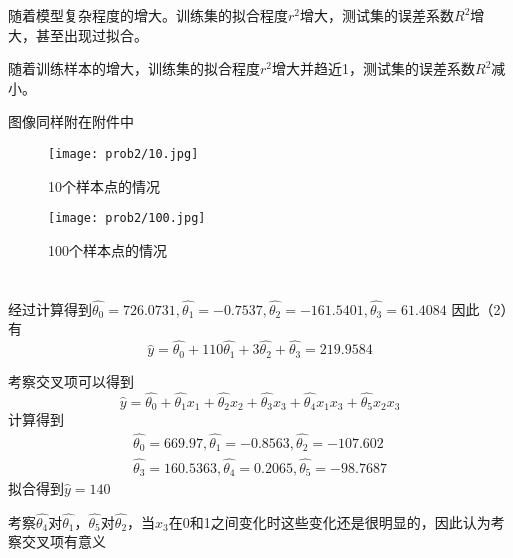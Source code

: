 \documentclass[UTF8,a4paper]{ctexart}
\begin{document}
随着模型复杂程度的增大。训练集的拟合程度$r^2$增大，测试集的误差系数$R^2$增大，甚至出现过拟合。

随着训练样本的增大，训练集的拟合程度$r^2$增大并趋近1，测试集的误差系数$R^2$减小。

图像同样附在附件中
\begin{figure}
\centering
\texttt{[image: prob2/10.jpg]}
\caption{10个样本点的情况}
\label{10}
\texttt{[image: prob2/100.jpg]}
\caption{100个样本点的情况}
\label{100}
\end{figure}
\section{}
经过计算得到$\hat{\theta_0}=726.0731,\hat{\theta_1}=-0.7537,\hat{\theta_2}=-161.5401,\hat{\theta_3}=61.4084$
因此（2）有$$\hat{y}=\hat{\theta_0}+110\hat{\theta_1}+3\hat{\theta_2}+\hat{\theta_3}=219.9584$$

考察交叉项可以得到$$\hat{y}=\hat{\theta_0}+\hat{\theta_1}x_1+\hat{\theta_2}x_2+\hat{\theta_3}x_3+\hat{\theta_4}x_1x_3+\hat{\theta_5}x_2x_3$$
计算得到  
$$\begin{aligned}\hat{\theta_0}=669.97,\hat{\theta_1}=-0.8563,\hat{\theta_2}=-107.602\\ \hat{\theta_3}=160.5363,\hat{\theta_4}=0.2065,\hat{\theta_5}=-98.7687\end{aligned}$$
拟合得到$\hat{y}=140$

考察$\hat{\theta_4}$对$\hat{\theta_1}$，$\hat{\theta_5}$对$\hat{\theta_2}$，当$x_3$在0和1之间变化时这些变化还是很明显的，因此认为考察交叉项有意义
\end{document}
